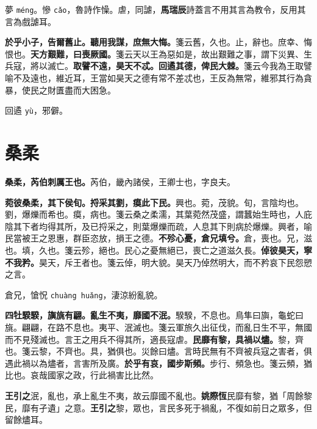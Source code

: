 \begin{quoting}夢 \texttt{méng}。慘 \texttt{cǎo}，魯詩作懆。虐，同謔，\textbf{馬瑞辰}詩蓋言不用其言為教令，反用其言為戲謔耳。\end{quoting}

\textbf{於乎小子，告爾舊止。聽用我謀，庶無大悔。}{\footnotesize 箋云舊，久也。止，辭也。庶幸、悔恨也。}\textbf{天方艱難，曰喪厥國。}{\footnotesize 箋云天以王為惡如是，故出艱難之事，謂下災異、生兵寇，將以滅亡。}\textbf{取譬不遠，昊天不忒。回遹其德，俾民大棘。}{\footnotesize 箋云今我為王取譬喻不及遠也，維近耳，王當如昊天之德有常不差忒也，王反為無常，維邪其行為貪暴，使民之財匱盡而大困急。}

\begin{quoting}回遹 \texttt{yù}，邪僻。\end{quoting}

\section{桑柔}


\textbf{桑柔，芮伯刺厲王也。}{\footnotesize 芮伯，畿內諸侯，王卿士也，字良夫。}

\textbf{菀彼桑柔，其下侯旬。捋采其劉，瘼此下民。}{\footnotesize 興也。菀，茂貌。旬，言陰均也。劉，爆爍而希也。瘼，病也。箋云桑之柔濡，其葉菀然茂盛，謂蠶始生時也，人庇陰其下者均得其所，及已捋采之，則葉爆爍而疏，人息其下則病於爆爍。興者，喻民當被王之恩惠，群臣恣放，損王之德。}\textbf{不殄心憂，倉兄填兮。}{\footnotesize 倉，喪也。兄，滋也。填，久也。箋云殄，絕也。民心之憂無絕已，喪亡之道滋久長。}\textbf{倬彼昊天，寧不我矜。}{\footnotesize 昊天，斥王者也。箋云倬，明大貌。昊天乃倬然明大，而不矜哀下民怨愬之言。}

\begin{quoting}倉兄，愴怳 \texttt{chuàng huǎng}，淒涼紛亂貌。\end{quoting}

\textbf{四牡騤騤，旟旐有翩。亂生不夷，靡國不泯。}{\footnotesize 騤騤，不息也。鳥隼曰旟，龜蛇曰旐。翩翩，在路不息也。夷平、泯滅也。箋云軍旅久出征伐，而亂日生不平，無國而不見殘滅也。言王之用兵不得其所，適長寇虐。}\textbf{民靡有黎，具禍以燼。}{\footnotesize 黎，齊也。箋云黎，不齊也。具，猶俱也。災餘曰燼。言時民無有不齊被兵寇之害者，俱遇此禍以為燼者，言害所及廣。}\textbf{於乎有哀，國步斯頻。}{\footnotesize 步行、頻急也。箋云頻，猶比也。哀哉國家之政，行此禍害比比然。}

\begin{quoting}\textbf{王引之}泯，亂也，承上亂生不夷，故云靡國不亂也。\textbf{姚際恆}民靡有黎，猶「周餘黎民，靡有孑遺」之意。\textbf{王引之}黎，眾也，言民多死于禍亂，不復如前日之眾多，但留餘燼耳。\end{quoting}

